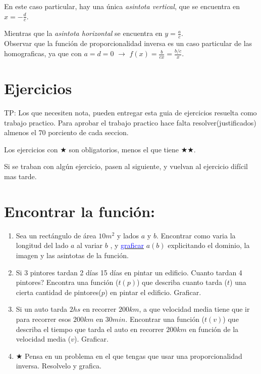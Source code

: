 \documentclass[a4paper,11pt,spanish,sans]{exam}
\begin{document}
En este caso particular, hay una única \textit{asintota vertical}, que se encuentra en $x=-\frac{d}{c}$.
 
Mientras que la \textit{asintota horizontal} se encuentra en $y=\frac{a}{c}$.\\

Observar que la función de proporcionalidad inversa es un caso particular de las homograficas, ya que con $a=d=0$ $\longrightarrow$ $f(x) = \frac{b}{c x}=\frac{b/c}{x}$.\\



\section*{Ejercicios}

TP: Los que necesiten nota, pueden entregar esta guia de ejercicios resuelta como trabajo practico. Para aprobar el trabajo practico hace falta resolver(justificados) almenos el 70 porciento de cada seccion. 

Los ejercicios con $\bigstar $ son obligatorios, menos el que tiene $\bigstar \bigstar$.


Si se traban con algún ejercicio, pasen al siguiente, y vuelvan al ejercicio difícil mas tarde.
\section{Encontrar la función:}
\begin{enumerate}
\item Sea un rectángulo de área $10m^2$  y lados $a$ y $b$. Encontrar como varia la longitud del lado $a$ al variar $b$ , y \href{https://tube.geogebra.org/m/1465885}{\textcolor{blue}{graficar}} $a(b)$ explicitando el dominio, la imagen y las asintotas de la función.
\item Si 3 pintores tardan 2 días 15 días en pintar un edificio. Cuanto tardan 4 pintores? 
Encontra una función ($t(p)$) que describa cuanto tarda ($t$) una cierta cantidad de pintores($p$) en pintar el edificio. Graficar.
\item Si un auto  tarda $2hs$ en recorrer $200km$, a que velocidad media tiene que ir para recorrer esos $200km$ en $30min$. Encontrar una función ($t(v)$) que describa el tiempo que tarda el auto en recorrer $200km$ en función de la velocidad media ($v$). Graficar.


\item $\bigstar$ Pensa en un problema en el que tengas que usar una proporcionalidad inversa. Resolvelo y grafica.

\end{enumerate}
\end{document}
